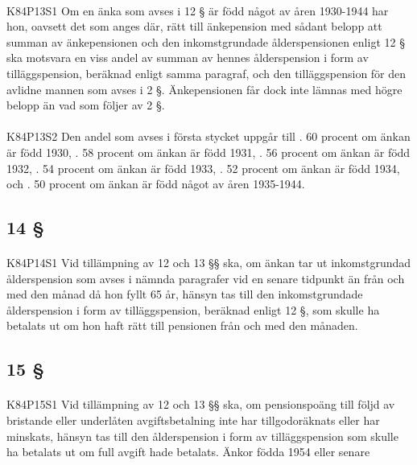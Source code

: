 \documentclass[a4paper,notitlepage,openany,10pt]{book}
\begin{document}
\paragraph*{}
{\tiny K84P13S1}
Om en änka som avses i 12 § är född något av åren 1930-1944 har hon, oavsett det som anges där, rätt till änkepension med sådant belopp att summan av änkepensionen och den inkomstgrundade ålderspensionen enligt 12 § ska motsvara en viss andel av summan av hennes ålderspension i form av tilläggspension, beräknad enligt samma paragraf, och den tilläggspension för den avlidne mannen som avses i 2 §.
Änkepensionen får dock inte lämnas med högre belopp än vad som följer av 2 §.
\paragraph*{}
{\tiny K84P13S2}
Den andel som avses i första stycket uppgår till
. 60 procent om änkan är född 1930,
. 58 procent om änkan är född 1931,
. 56 procent om änkan är född 1932,
. 54 procent om änkan är född 1933,
. 52 procent om änkan är född 1934, och
. 50 procent om änkan är född något av åren 1935-1944.
\subsection*{14 §}
\paragraph*{}
{\tiny K84P14S1}
Vid tillämpning av 12 och 13 §§ ska, om änkan tar ut inkomstgrundad ålderspension som avses i nämnda paragrafer vid en senare tidpunkt än från och med den månad då hon fyllt 65 år, hänsyn tas till den inkomstgrundade ålderspension i form av tilläggspension, beräknad enligt 12 §, som skulle ha betalats ut om hon haft rätt till pensionen från och med den månaden.
\subsection*{15 §}
\paragraph*{}
{\tiny K84P15S1}
Vid tillämpning av 12 och 13 §§ ska, om pensionspoäng till följd av bristande eller underlåten avgiftsbetalning inte har tillgodoräknats eller har minskats, hänsyn tas till den ålderspension i form av tilläggspension som skulle ha betalats ut om full avgift hade betalats.
Änkor födda 1954 eller senare
\end{document}
